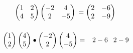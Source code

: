 \begin{gather*}
\begin{pmatrix}
\alert<2,3>{1}&\alert<2,3>{2}\\
\alert<4,5>{4}&\alert<4,5>{5}
\end{pmatrix}
\begin{pmatrix}
 \alert<2,4>{-2}&\alert<3,5>{ 4}\\
 \alert<2,4>{ 2}&\alert<3,5>{-5}
\end{pmatrix}
\visible<2-6>{
 {}=\begin{pmatrix}
  \uncover<2->{\alert<2>{ 2}}&
  \uncover<3->{\alert<3>{-6}}\\
  \uncover<4->{\alert<4>{ 2}}&
  \uncover<5->{\alert<5>{-9}}
 \end{pmatrix}}
\\[\bigskipamount]
\vphantom{\begin{pmatrix}1\\2\end{pmatrix}}%
\invisible<1,6>{
 \alert{
  \only<2,3>{\begin{pmatrix}1\\2\end{pmatrix}}
  \only<4,5>{\begin{pmatrix}4\\5\end{pmatrix}}
  \bullet
  \only<2,4>{\begin{pmatrix}-2\\ 2\end{pmatrix}}
  \only<3,5>{\begin{pmatrix} 4\\-5\end{pmatrix}}
  =
  \only<2>{\phantom-2}\only<3>{-6}
  \only<4>{\phantom-2}\only<5>{-9}}}
\end{gather*}
